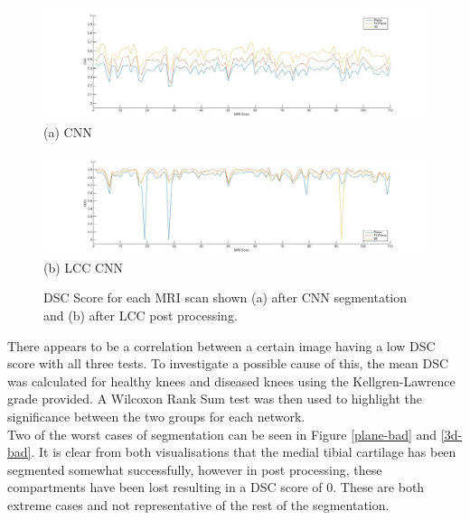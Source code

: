 \documentclass[11pt,a4paper]{memoir}
\numberwithin{figure}{section}
\numberwithin{table}{section}
\numberwithin{equation}{section}
\begin{document}
\begin{figure} [!h]
\centering
\label{subfig:a}
\includegraphics[trim={5cm 0 4cm 0},clip,width=1\textwidth]{Dice_chart.jpg}\\ (a) CNN

\label{subfig:b} 
\includegraphics[trim={5cm 0 0 0},clip,width=1.1\textwidth]{LCC_chart.jpg} (b) LCC CNN
\caption[DSC scores shown for each individual MRI scan after CNN segmentation and LCC CNN segmentation]{DSC Score for each MRI scan shown (a) after CNN segmentation and (b) after LCC post processing.}
\label{lines} 

\end{figure}

There appears to be a correlation between a certain image having a low DSC score with all three tests. To investigate a possible cause of this, the mean DSC was calculated for healthy knees and diseased knees using the Kellgren-Lawrence grade provided. A Wilcoxon Rank Sum test was then used to highlight the significance between the two groups for each network. \\

Two of the worst cases of segmentation can be seen in Figure \ref{plane-bad} and \ref{3d-bad}. It is clear from both visualisations that the medial tibial cartilage has been segmented somewhat successfully, however in post processing, these compartments have been lost resulting in a DSC score of 0. These are both extreme cases and not representative of the rest of the segmentation. 
\end{document}
